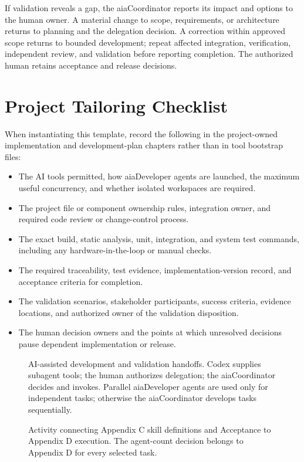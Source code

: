 If validation reveals a gap, the aiaCoordinator reports its impact and options to
the human owner. A material change to scope, requirements, or architecture
returns to planning and the delegation decision. A correction within approved
scope returns to bounded development; repeat affected integration,
verification, independent review, and validation before reporting completion.
The authorized human retains acceptance and release decisions.

\section{Project Tailoring Checklist}
\label{Section:AIImplementationTailoring}
When instantiating this template, record the following in the project-owned
implementation and development-plan chapters rather than in tool bootstrap
files:
\begin{itemize}
\item The AI tools permitted, how aiaDeveloper agents are launched, the maximum
useful concurrency, and whether isolated workspaces are required.
\item The project file or component ownership rules, integration owner, and
required code review or change-control process.
\item The exact build, static analysis, unit, integration, and system test
commands, including any hardware-in-the-loop or manual checks.
\item The required traceability, test evidence, implementation-version record,
and acceptance criteria for completion.
\item The validation scenarios, stakeholder participants, success criteria,
evidence locations, and authorized owner of the validation disposition.
\item The human decision owners and the points at which unresolved decisions
pause dependent implementation or release.
\end{itemize}

\begin{figure}[htbp]
  \centering
  \resizebox{\linewidth}{!}{}
  \caption[AI-assisted development and validation handoffs.]{AI-assisted development and validation handoffs. Codex supplies subagent tools; the human authorizes delegation; the aiaCoordinator decides and invokes. Parallel aiaDeveloper agents are used only for independent tasks; otherwise the aiaCoordinator develops tasks sequentially.}
  \label{Figure:AIImplementationSequence}
\end{figure}

\begin{figure}[htbp]
  \centering
  \resizebox{\linewidth}{!}{}
  \caption{Activity connecting Appendix C skill definitions and Acceptance to Appendix D execution. The agent-count decision belongs to Appendix D for every selected task.}
  \label{Figure:AITaskExecutionActivity}
\end{figure}
